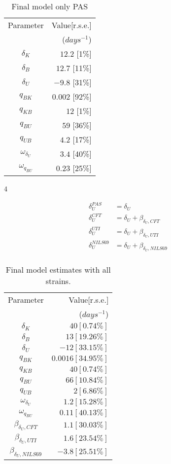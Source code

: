 \begin{table}
	\begin{tabular}{|c|r|}
		\hline
		Parameter & Value[r.s.e.]\\ 
		 & ($days^{-1}$) \\ \hline
		$\delta_{K}$ & $12.2$ [1\%] \\
		$\delta_{B}$ & $12.7$ [11\%] \\
		$\delta_{U}$ & $-9.8$ [31\%] \\
		$q_{BK}$ & $0.002$ [92\%] \\
		$q_{KB}$ & $12$ [1\%] \\
		$q_{BU}$ & $59$ [36\%] \\
		$q_{UB}$ & $4.2$ [17\%] \\ \hline
		$\omega_{\delta_{U}}$ & $3.4$ [40\%]\\
		$\omega_{q_{BU}}$ & $0.23$ [25\%]\\
		\hline
	\end{tabular}
	\caption{Final model only PAS}
\end{table}


4

\begin{align}
	\delta_{U}^{PAS} &= \delta_{U} \\
	\delta_{U}^{CFT} &= \delta_{U} + \beta_{\delta_{U}, CFT} \\
	\delta_{U}^{UTI} &= \delta_{U} + \beta_{\delta_{U}, UTI} \\
	\delta_{U}^{NILS69} &= \delta_{U} + \beta_{\delta_{U}, NILS69} \\
\end{align}

\begin{table}
	\begin{tabular}{|c|r|}
		\hline
		Parameter & Value[r.s.e.] \\ 
		 & ($days^{-1}$) \\ \hline
		$\delta_{K}$ & $40[0.74\%]$ \\
		$\delta_{B}$ & $13[19.26\%]$ \\
		$\delta_{U}$ & $-12[33.15\%]$ \\
		$q_{BK}$ & $ 0.0016[34.95\%]$ \\
		$q_{KB}$ & $40[0.74\%]$ \\
		$q_{BU}$ & $66[10.84\%]$ \\
		$q_{UB}$ & $2[6.86\%]$ \\ \hline
		$\omega_{\delta_{U}}$ & $1.2[15.28\%]$ \\
		$\omega_{q_{BU}}$ & $0.11[40.13\%]$ \\
		\hline
		$\beta_{\delta_{U}, CFT}$ & $1.1 [30.03\%]$ \\
		$\beta_{\delta_{U}, UTI}$ & $1.6 [23.54\%]$ \\
		$\beta_{\delta_{U}, NILS69}$ & $-3.8 [25.51\%]$ \\
		\hline
	\end{tabular}
	\caption{Final model estimates with all strains.}
\end{table}